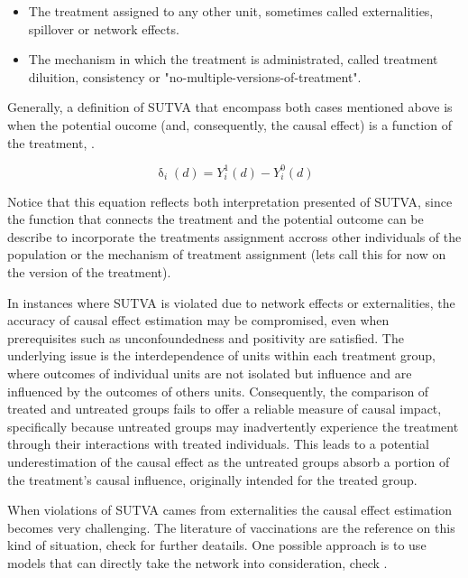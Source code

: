 \begin{itemize}
  \item The treatment assigned to any other unit, sometimes called externalities, spillover or network effects.
  \item The mechanism in which the treatment is administrated, called treatment diluition, consistency or "no-multiple-versions-of-treatment".
\end{itemize}

Generally, a definition of SUTVA that encompass both cases mentioned above is when the potential oucome (and, consequently, the causal effect) is a function of the treatment, \parencite{morgan_counterfactuals_2015}. 

\begin{equation}
  \updelta_i(d) = Y_i^1(d) - Y_i^0(d)
  \label{eq:sutva_violation}
\end{equation}

Notice that this equation reflects both interpretation presented of \gls{SUTVA}, since the function that connects the treatment and the potential outcome can be describe to incorporate the treatments assignment accross other 
individuals of the population or the mechanism of treatment assignment (lets call this for now on the version of the treatment). 

In instances where \gls{SUTVA} is violated due to network effects or externalities, the accuracy of causal effect estimation may be compromised, even 
when prerequisites such as unconfoundedness and positivity are satisfied. The underlying issue is the interdependence of units within each treatment group,
where outcomes of individual units are not isolated but influence and are influenced by the outcomes of others units. Consequently, the comparison of treated
and untreated groups fails to offer a reliable measure of causal impact, specifically because untreated groups may inadvertently experience the treatment
through their interactions with treated individuals. This leads to a potential underestimation of the causal effect as the untreated groups absorb
a portion of the treatment's causal influence, originally intended for the treated group.

When violations of \gls{SUTVA} cames from externalities the causal effect estimation becomes very challenging. The literature of vaccinations are the reference on this kind of situation, check \textcite{hudgens_toward_2008} for further deatails. 
One possible approach is to use models that can directly take the network into consideration, check \textcite{goldsmith-pinkham_social_2013}.


